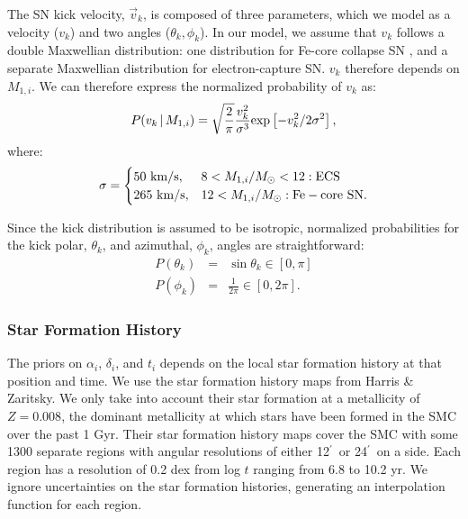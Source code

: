 \documentclass[12pt, preprint]{aastex}
\newcommand{\given}{\,|\,}
\newcommand{\amin}{\ifmmode {^{\prime}\ }\else$^{\prime}$\fi}
\newcommand{\Msun}{\ifmmode {M_{\odot}}\else${M_{\odot}}$\fi}
\begin{document}
The SN kick velocity, $\vec{v}_k$, is composed of three parameters, which we model as a velocity ($v_k$) and two angles ($\theta_k, \phi_k$). In our model, we assume that $v_k$ follows a double Maxwellian distribution: one distribution for Fe-core collapse SN \citep[with a dispersion of 265 km s$^{-1}$][]{hobbs05}, and a separate Maxwellian distribution for electron-capture SN. $v_k$ therefore depends on $M_{1,i}$. We can therefore express the normalized probability of $v_k$ as:
\begin{equation}
P(v_k \given M_{1,i}) = \sqrt{\frac{2}{\pi}} \frac{v_k^2} {\sigma^3} {\rm exp} \left[ -v_k^2 / 2 \sigma^2 \right], \label{eq:P_v_k}
\end{equation}
where:
\begin{equation}
\sigma = 
\begin{cases} 
      50\ {\rm km/s}, & 8 < M_{1,i}/\Msun < 12: {\rm ECS}\\
     265\ {\rm km/s}, & 12 < M_{1,i}/\Msun: {\rm Fe-core\ SN}.
   \end{cases}
\end{equation}


Since the kick distribution is assumed to be isotropic, normalized probabilities for the kick polar, $\theta_k$, and azimuthal, $\phi_k$, angles are straightforward:
\begin{eqnarray}
P(\theta_k) &=& \sin \theta_k \in [0, \pi] \label{eq:P_theta_k} \\
P(\phi_k) &=& \frac{1}{2 \pi} \in [0, 2\pi] . \label{eq:P_phi_k}
\end{eqnarray}



\subsubsection{Star Formation History}

The priors on $\alpha_i$, $\delta_i$, and $t_i$ depends on the local star formation history at that position and time. We use the star formation history maps from Harris \& Zaritsky. We only take into account their star formation at a metallicity of $Z=0.008$, the dominant metallicity at which stars have been formed in the SMC over the past 1 Gyr. Their star formation history maps cover the SMC with some 1300 separate regions with angular resolutions of either 12\amin\ or 24\amin\ on a side. Each region has a resolution of 0.2 dex from log $t$ ranging from 6.8 to 10.2 yr. We ignore uncertainties on the star formation histories, generating an interpolation function for each region. 
\end{document}
